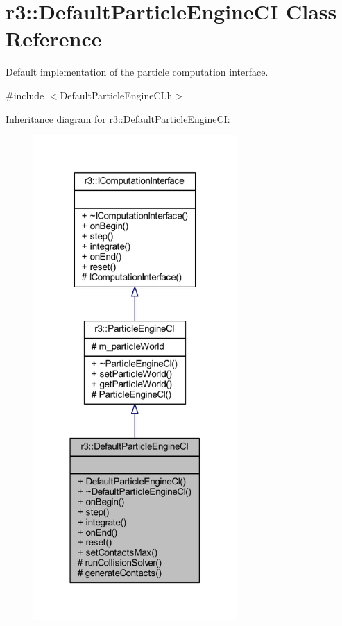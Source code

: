 \hypertarget{classr3_1_1_default_particle_engine_c_i}{}\section{r3\+:\+:Default\+Particle\+Engine\+CI Class Reference}
\label{classr3_1_1_default_particle_engine_c_i}


Default implementation of the particle computation interface.  




{\ttfamily \#include $<$Default\+Particle\+Engine\+C\+I.\+h$>$}



Inheritance diagram for r3\+:\+:Default\+Particle\+Engine\+CI\+:\nopagebreak
\begin{figure}[H]
\begin{center}
\leavevmode
\includegraphics[width=220pt]{classr3_1_1_default_particle_engine_c_i__inherit__graph}
\end{center}
\end{figure}



